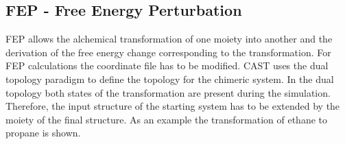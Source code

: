\documentclass[10pt,a4paper]{article} %
\begin{document}
	\subsection{FEP - Free Energy Perturbation}
	\acf{FEP} allows the alchemical transformation of one moiety into another and the derivation of the free energy change corresponding to the transformation. For \ac{FEP} calculations the coordinate file has to be modified. \ac{CAST} uses the dual topology paradigm to define the topology for the chimeric system. In the dual topology both states of the transformation are present during the simulation. Therefore, the input structure of the starting system has to be extended by the moiety of the final structure. As an example the transformation of ethane to propane is shown. \\
\end{document}

